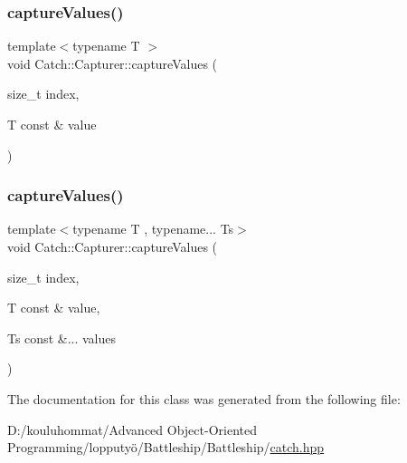 \mbox{\label{class_catch_1_1_capturer_a60d08e6db2e54740bb2298bbbec3bc0b}} 
\subsubsection{\texorpdfstring{capture\+Values()}{captureValues()}\hspace{0.1cm}{\footnotesize\ttfamily [1/2]}}
{\footnotesize\ttfamily template$<$typename T $>$ \\
void Catch\+::\+Capturer\+::capture\+Values (\begin{DoxyParamCaption}\item[{size\+\_\+t}]{index,  }\item[{T const \&}]{value }\end{DoxyParamCaption})\hspace{0.3cm}{\ttfamily [inline]}}

\mbox{\label{class_catch_1_1_capturer_a76f2a097cfeb3042688300b81eb9bcbc}} 
\subsubsection{\texorpdfstring{capture\+Values()}{captureValues()}\hspace{0.1cm}{\footnotesize\ttfamily [2/2]}}
{\footnotesize\ttfamily template$<$typename T , typename... Ts$>$ \\
void Catch\+::\+Capturer\+::capture\+Values (\begin{DoxyParamCaption}\item[{size\+\_\+t}]{index,  }\item[{T const \&}]{value,  }\item[{Ts const \&...}]{values }\end{DoxyParamCaption})\hspace{0.3cm}{\ttfamily [inline]}}



The documentation for this class was generated from the following file\+:\begin{DoxyCompactItemize}
\item 
D\+:/kouluhommat/\+Advanced Object-\/\+Oriented Programming/lopputyö/\+Battleship/\+Battleship/\mbox{\hyperlink{catch_8hpp}{catch.\+hpp}}\end{DoxyCompactItemize}

